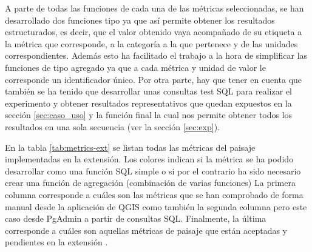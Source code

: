 A parte de todas las funciones de cada una de las métricas seleccionadas, se han desarrollado dos funciones tipo ya que así permite obtener los resultados estructurados, es decir, que el valor obtenido vaya acompañado de su etiqueta a la métrica que corresponde, a la categoría a la que pertenece y de las unidades correspondientes. Además esto ha facilitado el trabajo a la hora de simplificar las funciones de tipo agregado ya que a cada métrica y unidad de valor le corresponde un identificador único. Por otra parte, hay que tener en cuenta que también se ha tenido que desarrollar unas consultas test SQL para realizar el experimento y obtener resultados representativos que quedan expuestos en la sección \ref{sec:caso_uso} y la función final la cual nos permite obtener todos los resultados en una sola secuencia (ver la sección \ref{sec:exp}). 

En la tabla \ref{tab:metrics-ext} se listan todas las métricas del paisaje implementadas en la extensión. Los colores indican si la métrica se ha podido desarrollar como una función SQL simple o si por el contrario ha sido necesario crear una función de agregación (combinación de varias funciones) La primera columna corresponde a cuáles son las métricas que se han comprobado de forma manual desde la aplicación de QGIS como también la segunda columna pero este caso desde PgAdmin a partir de consultas SQL. Finalmente, la última corresponde a cuáles son aquellas métricas de paisaje que están aceptadas y pendientes en la extensión \pgland{}. 

